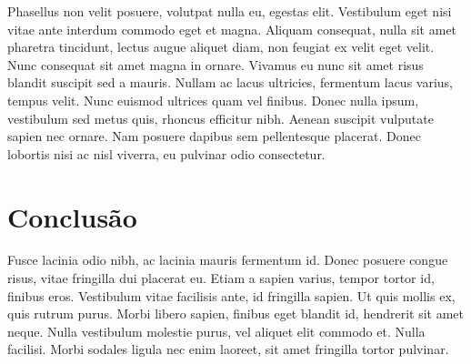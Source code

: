 \documentclass[a4paper, 12pt]{article}
\begin{document}
\cite{meuatalho}

Phasellus non velit posuere, volutpat nulla eu, egestas elit. Vestibulum eget nisi vitae ante interdum commodo eget et magna. Aliquam consequat, nulla sit amet pharetra tincidunt, lectus augue aliquet diam, non feugiat ex velit eget velit. Nunc consequat sit amet magna in ornare. Vivamus eu nunc sit amet risus blandit suscipit sed a mauris. Nullam ac lacus ultricies, fermentum lacus varius, tempus velit. Nunc euismod ultrices quam vel finibus. Donec nulla ipsum, vestibulum sed metus quis, rhoncus efficitur nibh. Aenean suscipit vulputate sapien nec ornare. Nam posuere dapibus sem pellentesque placerat. Donec lobortis nisi ac nisl viverra, eu pulvinar odio consectetur. 

\section{Conclusão}


Fusce lacinia odio nibh, ac lacinia mauris fermentum id. Donec posuere congue risus, vitae fringilla dui placerat eu. Etiam a sapien varius, tempor tortor id, finibus eros. Vestibulum vitae facilisis ante, id fringilla sapien. Ut quis mollis ex, quis rutrum purus. Morbi libero sapien, finibus eget blandit id, hendrerit sit amet neque. Nulla vestibulum molestie purus, vel aliquet elit commodo et. Nulla facilisi. Morbi sodales ligula nec enim laoreet, sit amet fringilla tortor pulvinar.



\end{document}
